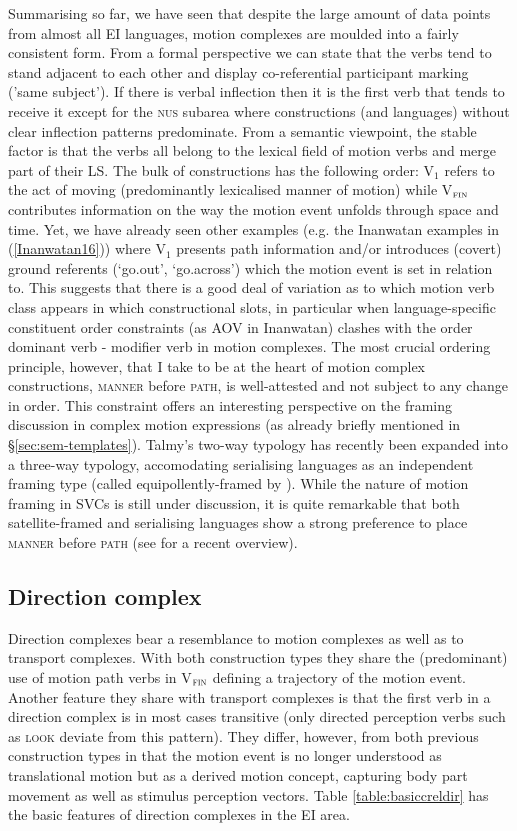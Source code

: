 Summarising so far, we have seen that despite the large amount of data points from almost all EI languages, motion complexes are moulded into a fairly consistent form. From a formal perspective we can state that the verbs tend to stand adjacent to each other and display co-referential participant marking ('same subject'). If there is verbal inflection then it is the first verb that tends to receive it except for the \textsc{nus} subarea where constructions (and languages) without clear inflection patterns predominate. From a semantic viewpoint, the stable factor is that the verbs all belong to the lexical field of motion verbs and merge part of their LS. The bulk of constructions has the following order: V$_{1}$ refers to the act of moving (predominantly lexicalised manner of motion) while V$_{\textsc{fin}}$ contributes information on the way the motion event unfolds through space and time. Yet, we have already seen other examples (e.g. the Inanwatan examples in (\ref{Inanwatan16})) where V$_{1}$ presents path information and/or introduces (covert) ground referents (`go.out', `go.across') which the motion event is set in relation to. This suggests that there is a good deal of variation as to which motion verb class appears in which constructional slots, in particular when language-specific constituent order constraints (as AOV in Inanwatan) clashes with the order dominant verb - modifier verb in motion complexes. The most crucial ordering principle, however, that I take to be at the heart of motion complex constructions, \textsc{manner} before \textsc{path}, is well-attested and not subject to any change in order. This constraint offers an interesting perspective on the framing discussion in complex motion expressions (as already briefly mentioned in §\ref{sec:sem-templates}). Talmy's two-way typology \citep{talmy1985lexicalization, talmy2000toward} has recently been expanded into a three-way typology, accomodating serialising languages as an independent framing type (called equipollently-framed by \citealt{slobin2004many}). While the nature of motion framing in SVCs is still under discussion, it is quite remarkable that both satellite-framed and serialising languages show a strong preference to place \textsc{manner} before \textsc{path} (see \citealt{Ameka2013} for a recent overview).

\subsection{Direction complex} \label{sec:direction}
Direction complexes bear a resemblance to motion complexes as well as to transport complexes. With both construction types they share the (predominant) use of motion path verbs in V$_{\textsc{fin}}$ defining a trajectory of the motion event. Another feature they share with transport complexes is that the first verb in a direction complex is in most cases transitive (only directed perception verbs such as \textsc{look} deviate from this pattern). They differ, however, from both previous construction types in that the motion event is no longer understood as translational motion but as a derived motion concept, capturing body part movement as well as stimulus perception vectors. Table \ref{table:basiccreldir} has the basic features of direction complexes in the EI area.

